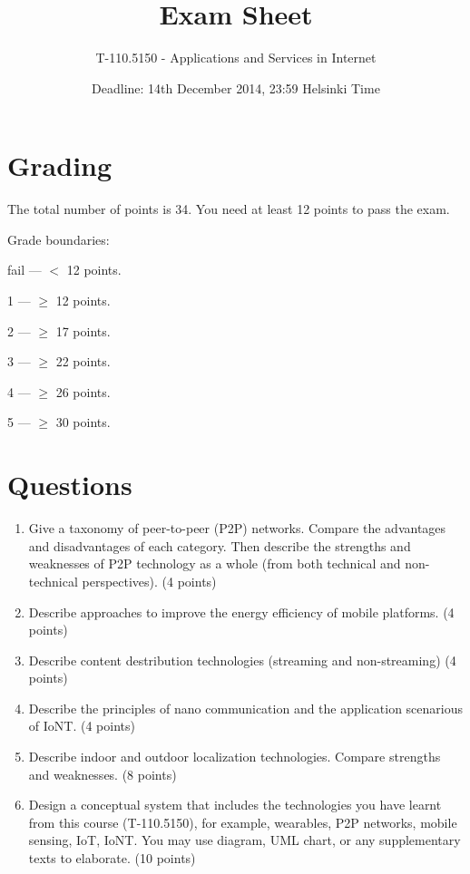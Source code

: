 \documentclass{article}
\title{\vspace{-10pt}Exam Sheet}
\author{T-110.5150 - Applications and Services in Internet}
\date{Deadline: 14th December 2014, 23:59 Helsinki Time}
\begin{document}
\maketitle

\section*{Grading}
\noindent
The total number of points is 34.
You need at least 12 points to pass the exam.

\noindent
Grade boundaries:
\vskip 10pt

fail --- $<$ 12 points.

1 --- $\ge$ 12 points.

2 --- $\ge$ 17 points.

3 --- $\ge$ 22 points.

4 --- $\ge$ 26 points.

5 --- $\ge$ 30 points.

\section*{Questions}

\begin{enumerate}

\item Give a taxonomy of peer-to-peer (P2P) networks. Compare the advantages and disadvantages of each category. Then describe the strengths and weaknesses of P2P technology as a whole (from both technical and non-technical perspectives). (4 points)

\item Describe approaches to improve the energy efficiency of mobile platforms. (4 points)

\item Describe content destribution technologies (streaming and non-streaming) (4 points)

\item Describe the principles of nano communication and the application scenarious of IoNT. (4 points)

\item Describe indoor and outdoor localization technologies. Compare strengths and weaknesses. (8 points)

\item Design a conceptual system that includes the technologies you have learnt from this course (T-110.5150), for example, wearables, P2P networks, mobile sensing, IoT, IoNT. You may use diagram, UML chart, or any supplementary texts to elaborate. (10 points)



\end{enumerate}
\end{document}
